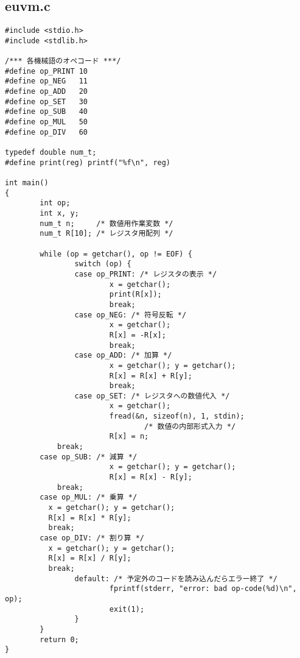 \documentclass[a4j]{jsarticle}  %
\begin{document}
\subsection{euvm.c}
\begin{verbatim}
#include <stdio.h>
#include <stdlib.h>

/*** 各機械語のオペコード ***/
#define op_PRINT 10
#define op_NEG   11
#define op_ADD   20
#define op_SET   30
#define op_SUB   40
#define op_MUL   50
#define op_DIV   60

typedef double num_t;
#define print(reg) printf("%f\n", reg)

int main()
{
        int op;
        int x, y;
        num_t n;     /* 数値用作業変数 */
        num_t R[10]; /* レジスタ用配列 */

        while (op = getchar(), op != EOF) {
                switch (op) {
                case op_PRINT: /* レジスタの表示 */
                        x = getchar();
                        print(R[x]);
                        break;
                case op_NEG: /* 符号反転 */
                        x = getchar();
                        R[x] = -R[x];
                        break;
                case op_ADD: /* 加算 */
                        x = getchar(); y = getchar();
                        R[x] = R[x] + R[y];
                        break;
                case op_SET: /* レジスタへの数値代入 */
                        x = getchar();
                        fread(&n, sizeof(n), 1, stdin);
                                /* 数値の内部形式入力 */
                        R[x] = n;
			break;
		case op_SUB: /* 減算 */ 
                        x = getchar(); y = getchar(); 
                        R[x] = R[x] - R[y];    
			break; 
		case op_MUL: /* 乗算 */ 
		  x = getchar(); y = getchar();                    
		  R[x] = R[x] * R[y];                       
		  break;   
		case op_DIV: /* 割り算 */ 
		  x = getchar(); y = getchar();        
		  R[x] = R[x] / R[y];              
		  break;
                default: /* 予定外のコードを読み込んだらエラー終了 */
                        fprintf(stderr, "error: bad op-code(%d)\n", op);
                        exit(1);
                }
        }
        return 0;
}
\end{verbatim}
\end{document}
